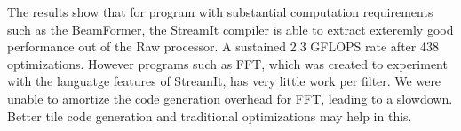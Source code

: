 The results show that for program with substantial computation
requirements such as the BeamFormer, the StreamIt compiler is able to
extract exteremly good performance out of the Raw processor. A
sustained 2.3 GFLOPS rate after 438%
optimizations. However programs such as FFT, which was created to
experiment with the languatge features of StreamIt, has very little
work per filter. We were unable to amortize the code generation
overhead for FFT, leading to a slowdown. Better tile code generation
and traditional optimizations may help in this. 

